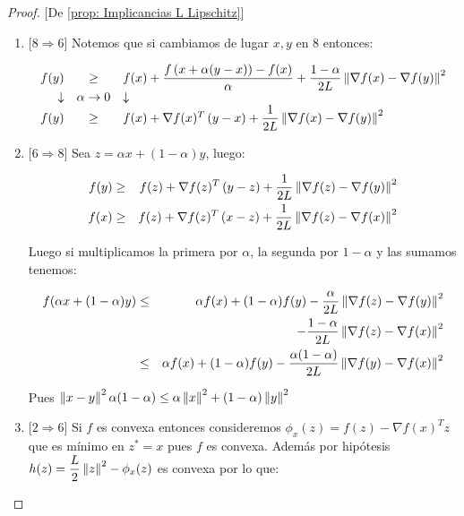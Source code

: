 \begin{proof}{[De \ref{prop: Implicancias L Lipschitz}]}
\begin{enumerate}
		\item {[$8 \Longrightarrow 6$]} Notemos que si cambiamos de lugar $x,y$ en $8$ entonces:
		
		
		\begin{equation*}
		\begin{array}{rcl}
			f(y) & \geq & f(x) + \dfrac{f\left(x + \alpha (y-x)\right) -f(x)}{\alpha} + \dfrac{1-\alpha}{2L}\left\lVert\nabla f(x) - \nabla f(y)\right\rVert^2 \\
			\downarrow & \alpha \rightarrow 0 & \downarrow \\
			f(y) & \geq & f(x) + \nabla f(x)^T \left(y-x\right) +  \dfrac{1}{2L}\left\lVert\nabla f(x) - \nabla f(y)\right\rVert^2 
		\end{array}
		\end{equation*} 
		
		\item {[$6 \Longrightarrow 8$]} Sea $z = \alpha x + (1-\alpha)y$, luego:
		
		\begin{equation*}
		\begin{aligned}
		f(y) & \geq & f(z) + \nabla f(z)^T \left(y-z\right) +  \dfrac{1}{2L}\left\lVert\nabla f(z) - \nabla f(y)\right\rVert^2  \\
		f(x) & \geq & f(z) + \nabla f(z)^T \left(x-z\right) +  \dfrac{1}{2L}\left\lVert\nabla f(z) - \nabla f(x)\right\rVert^2 
		\end{aligned}
		\end{equation*}
		
		Luego si multiplicamos la primera por $\alpha$, la segunda por $1-\alpha$ y las sumamos tenemos:
		
		\begin{equation*}
			\begin{aligned}
				f(\alpha x + (1-\alpha)y) & \leq & \alpha f(x) + (1-\alpha)f(y) - \dfrac{\alpha}{2L}\left\lVert\nabla f(z) - \nabla f(y)\right\rVert^2 \\ & & - \dfrac{1-\alpha}{2L}\left\lVert\nabla f(z) - \nabla f(x)\right\rVert^2 \\
				& \leq & \alpha f(x) + (1-\alpha)f(y) - \dfrac{\alpha (1-\alpha)}{2L}\left\lVert\nabla f(y) - \nabla f(x)\right\rVert^2
			\end{aligned}
		\end{equation*}
		
		Pues $\left\lVert x-y\right\rVert^2\alpha (1-\alpha) \leq \alpha \left\lVert x\right\rVert^2 + (1-\alpha)\left\lVert y\right\rVert^2$
		
			\item {[$2 \Longrightarrow 6$]} Si $f$ es convexa entonces consideremos $\phi_x(z) = f(z) - \nabla f(x)^T z$ que es m\'inimo en $z^* = x$ pues $f$ es convexa. Adem\'as por hip\'otesis $h(z) = \dfrac{L}{2} \left\lVert z\right\rVert^2 - \phi_x(z)$ es convexa por lo que:
		

\end{enumerate}
\end{proof}
